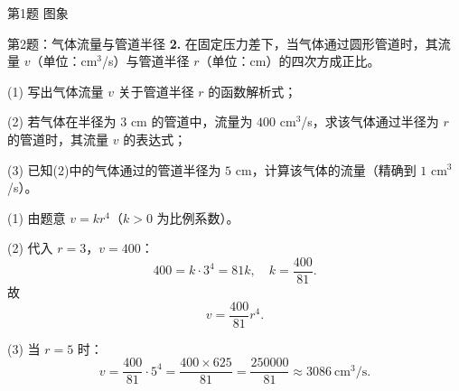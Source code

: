 \documentclass[10pt,aspectratio=169,serif,fleqn]{beamer}
\begin{document}
\begin{frame}[t]{第1题 图象}
\begin{center}
\end{center}
\end{frame}

\begin{frame}[t]{第2题：气体流量与管道半径}
\textbf{2.} 在固定压力差下，当气体通过圆形管道时，其流量 $v$（单位：cm$^3$/s）与管道半径 $r$（单位：cm）的四次方成正比。

(1) 写出气体流量 $v$ 关于管道半径 $r$ 的函数解析式；

(2) 若气体在半径为 $3$ cm 的管道中，流量为 $400$ cm$^3$/s，求该气体通过半径为 $r$ 的管道时，其流量 $v$ 的表达式；

(3) 已知(2)中的气体通过的管道半径为 $5$ cm，计算该气体的流量（精确到 $1$ cm$^3$/s）。
\end{frame}

\begin{frame}[t]{}\vspace{-1em}
\begin{tcolorbox}[colback=orange!10,colframe=orange,title=\textbf{解}]
(1) 由题意 $v=kr^4$（$k>0$ 为比例系数）。

\vspace{0.5em}
(2) 代入 $r=3$，$v=400$：
\[
400=k\cdot 3^4=81k,\quad k=\frac{400}{81}.
\]
故
\[
v=\frac{400}{81}r^4.
\]

\vspace{0.5em}
(3) 当 $r=5$ 时：
\[
v=\frac{400}{81}\cdot 5^4=\frac{400\times 625}{81}=\frac{250000}{81}\approx 3086\ \text{cm}^3/\text{s}.
\]
\end{tcolorbox}
\end{frame}
\end{document}
